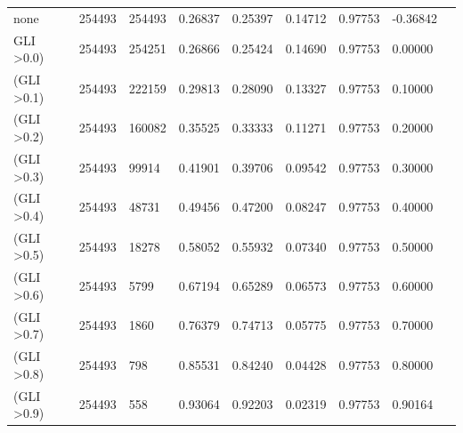 \documentclass[drones,technicalnote,accept,pdftex,moreauthors]{Definitions/mdpi}
\providecommand{\DIFadd}[1]{{\protect\color{blue}\uwave{#1}}} %
\providecommand{\DIFaddFL}[1]{\DIFadd{#1}} %
\providecommand{\DIFaddbeginFL}{} %
\providecommand{\DIFaddendFL}{} %
\newcommand{\DIFaddincludegraphics}[2][]{{\color{blue}\fbox{\DIFOincludegraphics[#1]{#2}}}} %
\DeclareRobustCommand{\DIFaddbeginFL}{\DIFOaddbeginFL \let\includegraphics\DIFaddincludegraphics} %
\DeclareRobustCommand{\DIFaddendFL}{\DIFOaddendFL \let\includegraphics\DIFOincludegraphics} %
\begin{document}
\begin{table}[H]
\begin{tabular}{lllllllll}
none                   & 254493          & 254493                            & 0.26837            & 0.25397              & 0.14712           & 0.97753           & -0.36842          \\
\DIFaddbeginFL \DIFaddFL{(}\DIFaddendFL GLI \textgreater 0.0) & 254493          & 254251                            & 0.26866            & 0.25424              & 0.14690           & 0.97753           & 0.00000           \\
(GLI \textgreater 0.1) & 254493          & 222159                            & 0.29813            & 0.28090              & 0.13327           & 0.97753           & 0.10000           \\
(GLI \textgreater 0.2) & 254493          & 160082                            & 0.35525            & 0.33333              & 0.11271           & 0.97753           & 0.20000           \\
(GLI \textgreater 0.3) & 254493          & 99914                             & 0.41901            & 0.39706              & 0.09542           & 0.97753           & 0.30000           \\
(GLI \textgreater 0.4) & 254493          & 48731                             & 0.49456            & 0.47200              & 0.08247           & 0.97753           & 0.40000           \\
(GLI \textgreater 0.5) & 254493          & 18278                             & 0.58052            & 0.55932              & 0.07340           & 0.97753           & 0.50000           \\
(GLI \textgreater 0.6) & 254493          & 5799                              & 0.67194            & 0.65289              & 0.06573           & 0.97753           & 0.60000           \\
(GLI \textgreater 0.7) & 254493          & 1860                              & 0.76379            & 0.74713              & 0.05775           & 0.97753           & 0.70000           \\
(GLI \textgreater 0.8) & 254493          & 798                               & 0.85531            & 0.84240              & 0.04428           & 0.97753           & 0.80000           \\
(GLI \textgreater 0.9) & 254493          & 558                               & 0.93064            & 0.92203              & 0.02319           & 0.97753           & 0.90164\\

\hline
\end{tabular}

\end{table}
\end{document}
